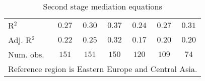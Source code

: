 \begin{sidewaystable}
\begin{center}
{\begin{tabular}{l c c c c c c}
\hline
R$^2$                            & $0.27$       & $0.30$       & $0.37$          & $0.24$      & $0.27$       & $0.31$      \\
Adj. R$^2$                       & $0.22$       & $0.25$       & $0.32$          & $0.17$      & $0.20$       & $0.20$      \\
Num. obs.                        & $151$        & $151$        & $150$           & $120$       & $109$        & $74$        \\
\hline
\multicolumn{7}{l}{\scriptsize{Reference region is Eastern Europe and Central Asia.}}
\end{tabular}
}
\caption{Second stage mediation equations}
\label{MediationTable2}
\end{center}
\end{sidewaystable}

